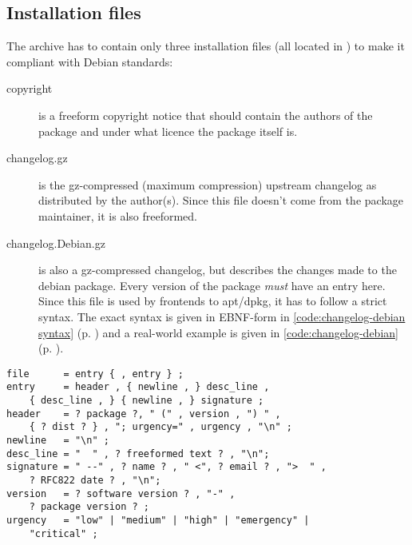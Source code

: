 \subsection{Installation files}\label{subsection:installation files}
The  archive has to contain only three installation files
(all located in ) to make it compliant
with Debian standards: 
\begin{description}
  \item[copyright] is a freeform copyright notice that should contain the
    authors of the package and under what licence the package itself is.
  \item[changelog.gz] is the gz-compressed (maximum compression) upstream
    changelog as distributed by the author(s). Since this file doesn't come from
    the package maintainer, it is also freeformed.
  \item[changelog.Debian.gz] is also a gz-compressed changelog, but describes
    the changes made to the debian package. Every version of the package
    \emph{must} have an entry here. Since this file is used by frontends to
    apt/dpkg, it has to follow a strict syntax. The exact syntax is given in
    EBNF-form in \lstlistingname{} \ref{code:changelog-debian syntax} (p.
    \pageref{code:changelog-debian syntax}) and a real-world example is given in
    \lstlistingname{} \ref{code:changelog-debian} (p. \pageref{code:changelog-%
    debian}). 
\end{description}

\begin{lstlisting}[label=code:changelog-debian syntax, caption={Syntax of the
changelog.Debian file in EBNF notation}]
file      = entry { , entry } ;
entry     = header , { newline , } desc_line , 
	{ desc_line , } { newline , } signature ;
header    = ? package ?, " (" , version , ") " , 
	{ ? dist ? } , "; urgency=" , urgency , "\n" ;
newline   = "\n" ;
desc_line = "  " , ? freeformed text ? , "\n";
signature = " --" , ? name ? , " <", ? email ? , ">  " ,
	? RFC822 date ? , "\n";
version   = ? software version ? , "-" , 
	? package version ? ;
urgency   = "low" | "medium" | "high" | "emergency" | 
	"critical" ;
\end{lstlisting}

